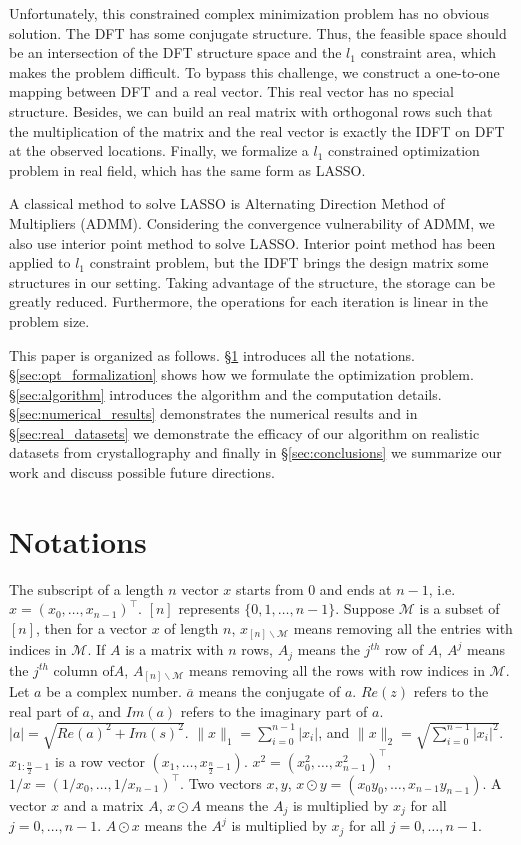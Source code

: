 \documentclass[final,onefignum,onetabnum]{siamart190516}
\begin{document}
Unfortunately, this constrained complex minimization problem has no obvious solution. The DFT has some conjugate structure. Thus, the feasible space should be an intersection of the DFT structure space and the $l_1$ constraint area, which makes the problem difficult. To bypass this challenge, we construct a one-to-one mapping between DFT and a real vector. This real vector has no special structure. Besides, we can build an real matrix with orthogonal rows such that the multiplication of the matrix and the real vector is exactly the IDFT on DFT at the observed locations. Finally, we formalize a $l_1$ constrained optimization problem in real field, which has the same form as LASSO\cite{tibshirani1996regression}.

A classical method to solve LASSO is Alternating Direction Method of Multipliers (ADMM)\cite{boyd2011distributed}. Considering the convergence vulnerability of ADMM, we also use interior point method\cite{boyd2004convex} to solve LASSO. Interior point method has been applied to $l_1$ constraint problem\cite{kim2007interior}, but the IDFT brings the design matrix some structures in our setting. Taking advantage of the structure, the storage can be greatly reduced. Furthermore, the operations for each iteration is linear in the problem size.

This paper is organized as follows. \S \ref{sec:notations} introduces all the notations. \S \ref{sec:opt_formalization} shows how we formulate the optimization problem. \S \ref{sec:algorithm} introduces the algorithm and the computation details. \S \ref{sec:numerical_results} demonstrates the numerical results and in \S \ref{sec:real_datasets} we demonstrate the efficacy of our algorithm on realistic datasets from crystallography and finally in \S \ref{sec:conclusions} we summarize our work and discuss possible future directions.

\section{Notations}\label{sec:notations}
The subscript of a length $n$ vector $x$ starts from 0 and ends at $n-1$, i.e. $x = (x_0,\dots,x_{n-1})^{\top}$. $[n]$ represents $\{0,1,\dots,n-1\}$. Suppose $\mathcal{M}$ is a subset of $[n]$, then for a vector $x$ of length $n$, $x_{[n]\backslash\mathcal{M}}$ means removing all the entries with indices in $\mathcal{M}$. If $A$ is a matrix with $n$ rows, $A_j$ means the $j^{th}$ row of $A$, $A^j$ means the $j^{th}$ column of$A$, $A_{[n]\backslash\mathcal{M}}$ means removing all the rows with row indices in $\mathcal{M}$. Let $a$ be a complex number. $\overline{a}$ means the conjugate of $a$. $Re(z)$ refers to the real part of $a$, and $Im(a)$ refers to the imaginary part of $a$. $|a|=\sqrt{Re(a)^2 + Im(s)^2}$. $\|x\|_1 = \sum_{i=0}^{n-1}|x_i|$, and $\|x\|_2 = \sqrt{\sum_{i=0}^{n-1}|x_i|^2}$. $x_{1:\frac{n}{2}-1}$ is a row vector $(x_1,\dots,x_{\frac{n}{2}-1})$. $x^2=(x_0^2,\dots,x_{n-1}^2)^{\top}$, $1/x = (1/x_0,\dots,1/x_{n-1})^{\top}$. Two vectors $x, y$, $x\odot y = (x_0y_0,\dots,x_{n-1}y_{n-1})$. A vector $x$ and a matrix $A$, $x\odot A $ means the $A_j$ is multiplied by $x_j$ for all $j=0,\dots,n-1$. $A \odot x$ means the $A^j$ is multiplied by $x_j$ for all $j=0,\dots,n-1$.
\end{document}
